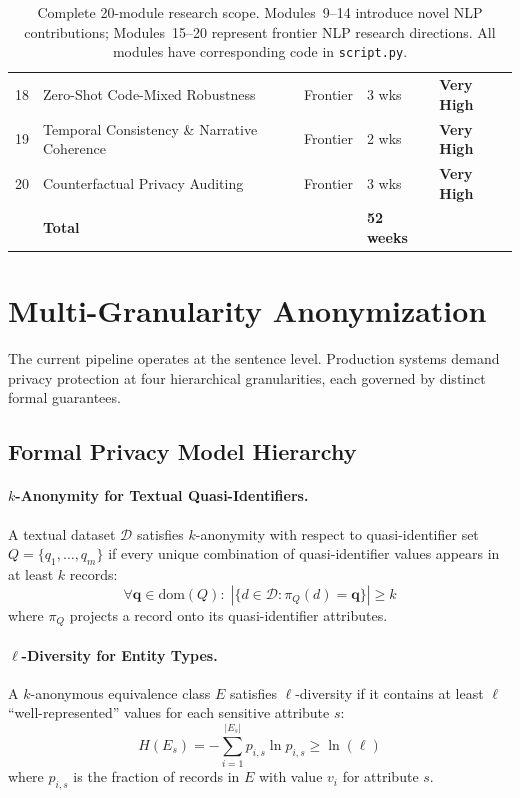 \documentclass[11pt, a4paper]{article}
\begin{document}
\begin{table}[H]
\begin{tabular}{cllll}
\rowcolor{cyan!8}
18 & Zero-Shot Code-Mixed Robustness & \textcolor{blue!70!black}{Frontier} & 3 wks & \textbf{Very High} \\
\rowcolor{cyan!8}
19 & Temporal Consistency \& Narrative Coherence & \textcolor{blue!70!black}{Frontier} & 2 wks & \textbf{Very High} \\
\rowcolor{cyan!8}
20 & Counterfactual Privacy Auditing & \textcolor{blue!70!black}{Frontier} & 3 wks & \textbf{Very High} \\
\midrule
& \textbf{Total} & & \textbf{52 weeks} & \\
\bottomrule
\end{tabular}
\caption{Complete 20-module research scope. Modules~9--14 introduce novel NLP contributions; Modules~15--20 represent frontier NLP research directions. All modules have corresponding code in \texttt{script.py}.}
\end{table}


\section{Multi-Granularity Anonymization}
\label{sec:multigranularity}

The current pipeline operates at the sentence level. Production systems demand privacy protection at four hierarchical granularities, each governed by distinct formal guarantees.

\subsection{Formal Privacy Model Hierarchy}

\paragraph{$k$-Anonymity for Textual Quasi-Identifiers.}
A textual dataset $\mathcal{D}$ satisfies $k$-anonymity with respect to quasi-identifier set $Q = \{q_1, \ldots, q_m\}$ if every unique combination of quasi-identifier values appears in at least $k$ records:
\begin{equation}
\forall \mathbf{q} \in \text{dom}(Q): \; |\{d \in \mathcal{D} : \pi_Q(d) = \mathbf{q}\}| \geq k
\end{equation}
where $\pi_Q$ projects a record onto its quasi-identifier attributes.

\paragraph{$\ell$-Diversity for Entity Types.}
A $k$-anonymous equivalence class $E$ satisfies $\ell$-diversity if it contains at least $\ell$ ``well-represented'' values for each sensitive attribute $s$:
\begin{equation}
H(E_s) = -\sum_{i=1}^{|E_s|} p_{i,s} \ln p_{i,s} \geq \ln(\ell)
\end{equation}
where $p_{i,s}$ is the fraction of records in $E$ with value $v_i$ for attribute $s$.
\end{document}
